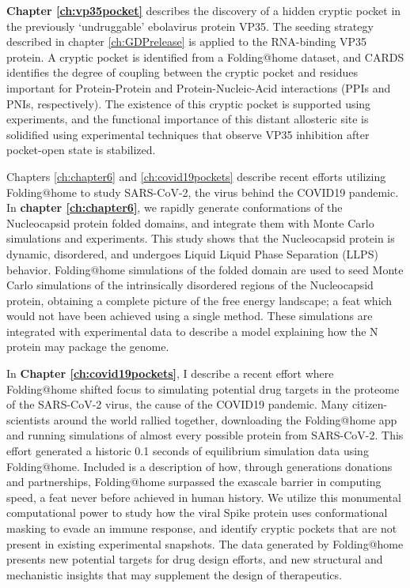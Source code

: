 \documentclass[../main.tex]{subfiles}
\begin{document}
	\textbf{Chapter \ref{ch:vp35pocket}} describes the discovery of a hidden cryptic pocket in the previously ‘undruggable’ ebolavirus protein VP35. The seeding strategy described in chapter \ref{ch:GDPrelease} is applied to the RNA-binding VP35 protein. A cryptic pocket is identified from a Folding@home dataset, and CARDS identifies the degree of coupling between the cryptic pocket and residues important for Protein-Protein and Protein-Nucleic-Acid interactions (PPIs and PNIs, respectively). The existence of this cryptic pocket is supported using experiments, and the functional importance of this distant allosteric site is solidified using experimental techniques that observe VP35 inhibition after pocket-open state is stabilized.

	Chapters \ref{ch:chapter6} and \ref{ch:covid19pockets} describe recent efforts utilizing Folding@home to study SARS-CoV-2, the virus behind the COVID19 pandemic. In \textbf{chapter \ref{ch:chapter6}}, we rapidly generate conformations of the Nucleocapsid protein folded domains, and integrate them with Monte Carlo simulations and experiments. This study shows that the Nucleocapsid protein is dynamic, disordered, and undergoes Liquid Liquid Phase Separation (LLPS) behavior. Folding@home simulations of the folded domain are used to seed Monte Carlo simulations of the intrinsically disordered regions of the Nucleocapsid protein, obtaining a complete picture of the free energy landscape; a feat which would not have been achieved using a single method. These simulations are integrated with experimental data to describe a model explaining how the N protein may package the genome.

	In \textbf{Chapter \ref{ch:covid19pockets}}, I describe a recent effort where Folding@home shifted focus to simulating potential drug targets in the proteome of the SARS-CoV-2 virus, the cause of the COVID19 pandemic. Many citizen-scientists around the world rallied together, downloading the Folding@home app and running simulations of almost every possible protein from SARS-CoV-2. This effort generated a historic 0.1 seconds of equilibrium simulation data using Folding@home. Included is a description of how, through generations donations and partnerships, Folding@home surpassed the exascale barrier in computing speed, a feat never before achieved in human history. We utilize this monumental computational power to study how the viral Spike protein uses conformational masking to evade an immune response, and identify cryptic pockets that are not present in existing experimental snapshots. The data generated by Folding@home presents new potential targets for drug design efforts, and new structural and mechanistic insights that may supplement the design of therapeutics. 
\end{document}
